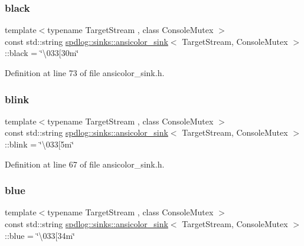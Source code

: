 \subsubsection{\texorpdfstring{black}{black}}
{\footnotesize\ttfamily template$<$typename Target\+Stream , class Console\+Mutex $>$ \\
const std\+::string \hyperlink{classspdlog_1_1sinks_1_1ansicolor__sink}{spdlog\+::sinks\+::ansicolor\+\_\+sink}$<$ Target\+Stream, Console\+Mutex $>$\+::black = \char`\"{}\textbackslash{}033\mbox{[}30m\char`\"{}}



Definition at line 73 of file ansicolor\+\_\+sink.\+h.

\mbox{\label{classspdlog_1_1sinks_1_1ansicolor__sink_addca553132fac957295bd585ce6f59a8}} 
\subsubsection{\texorpdfstring{blink}{blink}}
{\footnotesize\ttfamily template$<$typename Target\+Stream , class Console\+Mutex $>$ \\
const std\+::string \hyperlink{classspdlog_1_1sinks_1_1ansicolor__sink}{spdlog\+::sinks\+::ansicolor\+\_\+sink}$<$ Target\+Stream, Console\+Mutex $>$\+::blink = \char`\"{}\textbackslash{}033\mbox{[}5m\char`\"{}}



Definition at line 67 of file ansicolor\+\_\+sink.\+h.

\mbox{\label{classspdlog_1_1sinks_1_1ansicolor__sink_aa5f719a0fe17fe167d2c90e65173865d}} 
\subsubsection{\texorpdfstring{blue}{blue}}
{\footnotesize\ttfamily template$<$typename Target\+Stream , class Console\+Mutex $>$ \\
const std\+::string \hyperlink{classspdlog_1_1sinks_1_1ansicolor__sink}{spdlog\+::sinks\+::ansicolor\+\_\+sink}$<$ Target\+Stream, Console\+Mutex $>$\+::blue = \char`\"{}\textbackslash{}033\mbox{[}34m\char`\"{}}



